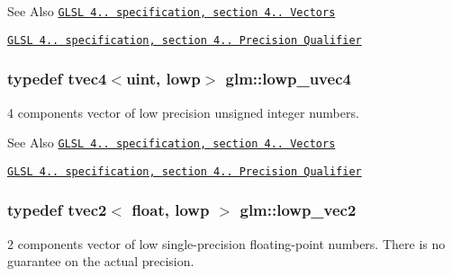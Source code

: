 \begin{DoxySeeAlso}{See Also}
\href{http://www.opengl.org/registry/doc/GLSLangSpec.4.20.8.pdf}{\tt G\-L\-S\-L 4.. specification, section 4.. Vectors} 

\href{http://www.opengl.org/registry/doc/GLSLangSpec.4.20.8.pdf}{\tt G\-L\-S\-L 4.. specification, section 4.. Precision Qualifier} 
\end{DoxySeeAlso}
\hypertarget{group__core__precision_ga5bb34ee8aba0f936bc521850819fc762}{
\subsubsection[{lowp\-\_\-uvec4}]{\setlength{\rightskip}{0pt plus 5cm}typedef tvec4$<$uint, lowp$>$ {\bf glm\-::lowp\-\_\-uvec4}}}\label{group__core__precision_ga5bb34ee8aba0f936bc521850819fc762}
4 components vector of low precision unsigned integer numbers.

\begin{DoxySeeAlso}{See Also}
\href{http://www.opengl.org/registry/doc/GLSLangSpec.4.20.8.pdf}{\tt G\-L\-S\-L 4.. specification, section 4.. Vectors} 

\href{http://www.opengl.org/registry/doc/GLSLangSpec.4.20.8.pdf}{\tt G\-L\-S\-L 4.. specification, section 4.. Precision Qualifier} 
\end{DoxySeeAlso}
\hypertarget{group__core__precision_ga1b46182364e2054858f9e7a70f8c52bc}{
\subsubsection[{lowp\-\_\-vec2}]{\setlength{\rightskip}{0pt plus 5cm}typedef tvec2$<$ float, lowp $>$ {\bf glm\-::lowp\-\_\-vec2}}}\label{group__core__precision_ga1b46182364e2054858f9e7a70f8c52bc}
2 components vector of low single-\/precision floating-\/point numbers. There is no guarantee on the actual precision.


